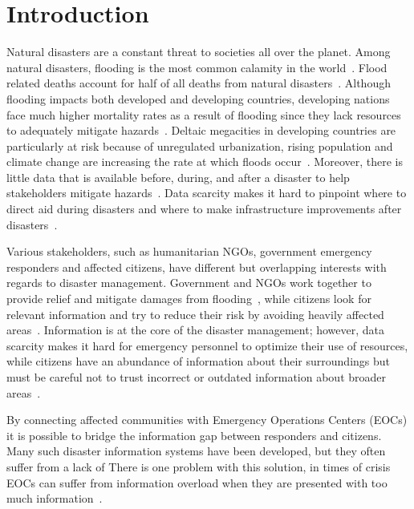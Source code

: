 \chapter{Introduction} Natural disasters are a constant threat to societies all
over the planet. Among natural disasters, flooding is the most common calamity
in the world~\cite{chanFloodRiskAsia2012}.  Flood related deaths account for
half of all deaths from natural disasters~\cite{ohlFloodingHumanHealth2000}.
Although flooding impacts both developed and developing countries, developing
nations face much higher mortality rates as a result of flooding since they lack
resources to adequately mitigate
hazards~\cite{quarantelliUrbanVulnerabilityDisasters2003,
ahernGlobalHealthImpacts2005}. Deltaic megacities in
developing countries are particularly at risk because of unregulated
urbanization, rising population and climate change are increasing the rate at
which floods occur~\cite{chanFloodRiskAsia2012}. Moreover, there is little data
that is available before, during, and after a disaster to help stakeholders
mitigate hazards~\cite{meierDigitalHumanitariansHow2015}. Data scarcity makes it
hard to pinpoint where to direct aid during disasters and where to make
infrastructure improvements after
disasters~\cite{ranaMultidimensionalModelVulnerability2018}.

Various stakeholders, such as humanitarian NGOs, government emergency
responders and affected citizens, have
different but overlapping interests with regards to disaster management.
Government and NGOs work together to provide relief and mitigate damages from
flooding~\cite{chanResilientFloodRisk2018}, while citizens
look for relevant information and try to reduce their
risk by avoiding heavily affected
areas~\cite{viewegMicrobloggingTwoNatural2010}. Information is at the core of
the disaster management; however, data scarcity makes it hard for emergency
personnel to optimize their use of resources, while citizens have an abundance
of information about their surroundings but must be careful not to trust
incorrect or outdated information about broader
areas~\cite{quarantelliProblematicalAspectsInformation1997}.

By connecting affected communities with Emergency Operations Centers (EOCs) it
is possible to bridge the information gap between responders and citizens. Many
such disaster information systems have been developed, but they often suffer
from a lack of
 There is one problem with this solution, in times of crisis
EOCs can suffer from information overload when they are presented with too much
information~\cite{tierneyFacingUnexpectedDisaster2001}.

